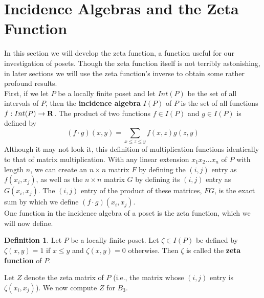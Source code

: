 \documentclass{article} %
\theoremstyle{definition}
\newtheorem{definition}{Definition}[section]
\theoremstyle{plain}
\begin{document}

\section{Incidence Algebras and the Zeta Function} %

In this section we will develop the zeta function, a function useful for our investigation of posets. Though the zeta function itself is not terribly astonishing, in later sections we will use the zeta function's inverse to obtain some rather profound results.\\

First, if we let $P$ be a locally finite poset and let $Int(P)$ be the set of all intervals of $P$, then the \textbf{incidence algebra} $I(P)$ of $P$ is the set of all functions $f:Int(P) \rightarrow \bf{R}$.
The product of two functions $f \in I(P)$ and $g \in I(P)$ is defined by %
\begin{displaymath}
(f \cdot g)(x,y)=\sum_{x \leq z \leq y} f(x,z)g(z,y)
\end{displaymath}
Although it may not look it, this definition of multiplication functions identically to that of matrix multiplication. With any linear extension $x_1x_2 \dots x_n$ of $P$ with length $n$, we can create an $n \times n$ matrix $F$ by defining the $(i,j)$ entry as $f(x_i,x_j)$, as well as the $n \times n$ matrix $G$ by defining its $(i,j)$ entry as $G(x_i,x_j)$. The $(i,j)$ entry of the product of these matrices, $FG$, is the exact sum by which we define $(f \cdot g)(x_i,x_j)$. \\

One function in the incidence algebra of a poset is the zeta function, which we will now define.

\begin{definition}
Let $P$ be a locally finite poset. Let $\zeta \in I(P)$ be defined by $\zeta (x,y)=1$ if $x \leq y$ and $\zeta (x, y)=0$ otherwise. Then $\zeta$ is called the \textbf{zeta function} of $P$.
\end{definition}

Let $Z$ denote the zeta matrix of $P$ (i.e., the matrix whose $(i,j)$ entry is $\zeta (x_i, x_j)$). We now compute $Z$ for $B_3$.
\end{document}
